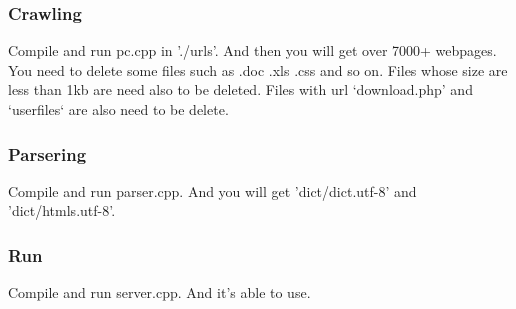 \documentclass[a4paper]{article}
\begin{document}
\subsubsection{Crawling}

Compile and run pc.cpp in './urls'. And then you will get over 7000+ webpages. You need to delete some files such as .doc .xls .css and so on. Files whose size are less than 1kb are need also to be deleted. Files with url `download.php' and `userfiles‘ are also need to be delete.

\subsubsection{Parsering}

Compile and run parser.cpp. And you will get 'dict/dict.utf-8' and 'dict/htmls.utf-8'.

\subsubsection{Run}

Compile and run server.cpp. And it's able to use. 
\end{document}
